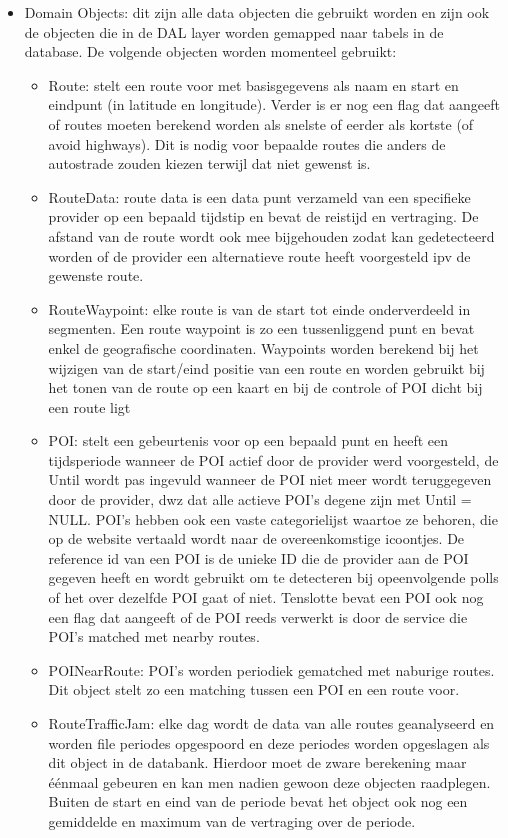 \begin{itemize}
\begin{itemize}
  \item Domain Objects: dit zijn alle data objecten die gebruikt worden en zijn ook de objecten die in de DAL layer worden gemapped naar tabels in de database. De volgende objecten worden momenteel gebruikt:
  	\begin{itemize}
    \item Route: stelt een route voor met basisgegevens als naam en start en eindpunt (in latitude en longitude). Verder is er nog een flag dat aangeeft of routes moeten berekend worden als snelste of eerder als kortste (of avoid highways). Dit is nodig voor bepaalde routes die anders de autostrade zouden kiezen terwijl dat niet gewenst is.
    \item RouteData: route data is een data punt verzameld van een specifieke provider op een bepaald tijdstip en bevat de reistijd en vertraging. De afstand van de route wordt ook mee bijgehouden zodat kan gedetecteerd worden of de provider een alternatieve route heeft voorgesteld ipv de gewenste route.
    \item RouteWaypoint: elke route is van de start tot einde onderverdeeld in segmenten. Een route waypoint is zo een tussenliggend punt en bevat enkel de geografische coordinaten. Waypoints worden berekend bij het wijzigen van de start/eind positie van een route en worden gebruikt bij het tonen van de route op een kaart en bij de controle of POI dicht bij een route ligt
    \newline
    \item POI: stelt een gebeurtenis voor op een bepaald punt en heeft een tijdsperiode wanneer de POI actief door de provider werd voorgesteld, de Until wordt pas ingevuld wanneer de POI niet meer wordt teruggegeven door de provider, dwz dat alle actieve POI's degene zijn met Until = NULL. POI's hebben ook een vaste categorielijst waartoe ze behoren, die op de website vertaald wordt naar de overeenkomstige icoontjes. De reference id van een POI is de unieke ID die de provider aan de POI gegeven heeft en wordt gebruikt om te detecteren bij opeenvolgende polls of het over dezelfde POI gaat of niet. Tenslotte bevat een POI ook nog een flag dat aangeeft of de POI reeds verwerkt is door de service die POI's matched met nearby routes.
    \item POINearRoute: POI's worden periodiek gematched met naburige routes. Dit object stelt zo een matching tussen een POI en een route voor.
    \newline
    \item RouteTrafficJam: elke dag wordt de data van alle routes geanalyseerd en worden file periodes opgespoord en deze periodes worden opgeslagen als dit object in de databank. Hierdoor moet de zware berekening maar éénmaal gebeuren en kan men nadien gewoon deze objecten raadplegen. Buiten de start en eind van de periode bevat het object ook nog een gemiddelde en maximum van de vertraging over de periode.

\end{itemize}
\end{itemize}
\end{itemize}
